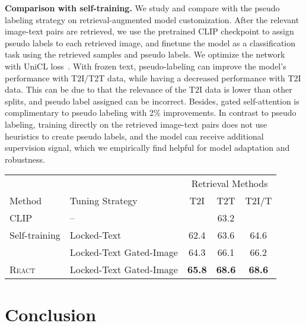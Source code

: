\documentclass[10pt,twocolumn,letterpaper]{article}
\renewcommand{\paragraph}[1]{\vspace{1.25mm}\noindent\textbf{#1}}
\newcommand{\shortname}{\textsc{React}}
\begin{document}
\paragraph{Comparison with self-training.}  We study and compare with the pseudo labeling strategy on retrieval-augmented model customization.  After the relevant image-text pairs are retrieved, we use the pretrained CLIP checkpoint to assign pseudo labels to each retrieved image, and finetune the model as a classification task using the retrieved samples and pseudo labels.  We optimize the network with UniCL loss~\cite{yang2022unicl}.  With frozen text, pseudo-labeling can improve the model's performance with T2I/T2T data, while having a decreased performance with T2I data. This can be due to that the relevance of the T2I data is lower than other splits, and pseudo label assigned can be incorrect.  Besides, gated self-attention is complimentary to pseudo labeling with 2\% improvements.
In contrast to pseudo labeling, training directly on the retrieved image-text pairs does not use heuristics to create pseudo labels, and the model can receive additional supervision signal, which we empirically find helpful for model adaptation and robustness.

\begin{table}[h!]
\vspace{-2mm}
    \centering
    \footnotesize
    \begin{tabular}{l|l|ccc}
        & & \multicolumn{3}{c}{Retrieval Methods} \\
        Method & Tuning Strategy & T2I & T2T & T2I/T \\
        \shline
        CLIP & -- & & 63.2 & \\
        \hline
        Self-training & Locked-Text & 62.4 & 63.6 & 64.6 \\
        & Locked-Text Gated-Image & 64.3 & 66.1 & 66.2 \\
        \hline
        \shortname{} & Locked-Text Gated-Image & \textbf{65.8} & \textbf{68.6} & \textbf{68.6} \\
    \end{tabular}
    \vspace{-0mm}
\label{tab:ablation_pseudo_label}
    \vspace{-3mm}
\end{table}
 \section{Conclusion}
\label{sec:conclusion}
\end{document}
